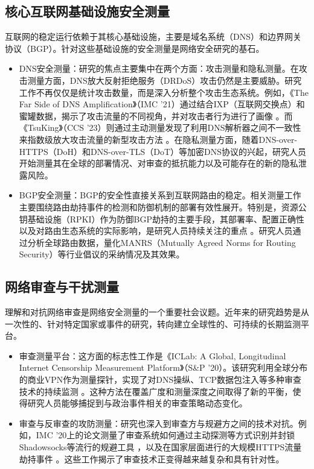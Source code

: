 \documentclass[conference]{IEEEtran}
\begin{document}
\subsection{核心互联网基础设施安全测量}
互联网的稳定运行依赖于其核心基础设施，主要是域名系统（DNS）和边界网关协议（BGP）。针对这些基础设施的安全测量是网络安全研究的基石。
\begin{itemize}
\item DNS安全测量：研究的焦点主要集中在两个方面：攻击测量和隐私测量。在攻击测量方面，DNS放大反射拒绝服务（DRDoS）攻击仍然是主要威胁。研究工作不再仅仅是统计攻击数量，而是深入分析整个攻击生态系统。例如，《The Far Side of DNS Amplification》（IMC '21）通过结合IXP（互联网交换点）和蜜罐数据，揭示了攻击流量的不同视角，并对攻击者行为进行了画像 。而《TsuKing》（CCS '23）则通过主动测量发现了利用DNS解析器之间不一致性来指数级放大攻击流量的新型攻击方法 。在隐私测量方面，随着DNS-over-HTTPS（DoH）和DNS-over-TLS（DoT）等加密DNS协议的兴起，研究人员开始测量其在全球的部署情况、对审查的抵抗能力以及可能存在的新的隐私泄露风险。
\item BGP安全测量：BGP的安全性直接关系到互联网路由的稳定。相关测量工作主要围绕路由劫持事件的检测和防御机制的部署有效性展开。特别是，资源公钥基础设施（RPKI）作为防御BGP劫持的主要手段，其部署率、配置正确性以及对路由生态系统的实际影响，是研究人员持续关注的重点 。研究人员通过分析全球路由数据，量化MANRS（Mutually Agreed Norms for Routing Security）等行业倡议的采纳情况及其效果。
\end{itemize}

\subsection{网络审查与干扰测量}
理解和对抗网络审查是网络安全测量的一个重要社会议题。近年来的研究趋势是从一次性的、针对特定国家或事件的研究，转向建立全球性的、可持续的长期监测平台。
\begin{itemize}
\item 审查测量平台：这方面的标志性工作是《ICLab: A Global, Longitudinal Internet Censorship Measurement Platform》（S\&P '20）。该研究利用全球分布的商业VPN作为测量探针，实现了对DNS操纵、TCP数据包注入等多种审查技术的持续监测 。这种方法在覆盖广度和测量深度之间取得了新的平衡，使得研究人员能够捕捉到与政治事件相关的审查策略动态变化。
\item 审查与反审查的攻防测量：研究也深入到审查方与规避方之间的技术对抗。例如，IMC '20上的论文测量了审查系统如何通过主动探测等方式识别并封锁Shadowsocks等流行的规避工具 ，以及在国家层面进行的大规模HTTPS流量劫持事件 。这些工作揭示了审查技术正变得越来越复杂和具有针对性。
\end{itemize}
\end{document}
